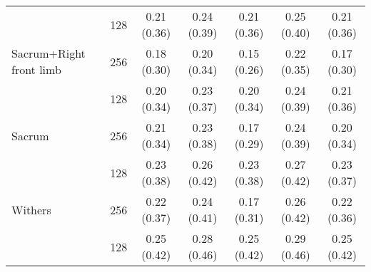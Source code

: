 \begin{table}[htbp]
{\begin{tabular}[H]{lcccccc}
    &\multicolumn{1}{c}{128}& \multicolumn{1}{c}{{\cellcolor{blue!10}0.21 (0.36)}} &  \multicolumn{1}{c}{\cellcolor{red!10}0.24 (0.39)} &  \multicolumn{1}{c}{\cellcolor{blue!10}0.21 (0.36)} &  \multicolumn{1}{c}{\cellcolor{red!15}0.25 (0.40)} &  \multicolumn{1}{c}{\cellcolor{blue!10}0.21 (0.36)} \\
    
    \multicolumn{1}{l}{Sacrum+Right front limb} &\multicolumn{1}{c}{256} & \multicolumn{1}{c}{{\cellcolor{blue!25}0.18 (0.30)}} &  \multicolumn{1}{c}{\cellcolor{blue!13}0.20 (0.34)} &  \multicolumn{1}{c}{\cellcolor{blue!45}0.15 (0.26)} &  \multicolumn{1}{c}{\cellcolor{blue!10}0.22 (0.35)} &  \multicolumn{1}{c}{\cellcolor{blue!35}0.17 (0.30)} \\

&\multicolumn{1}{c}{128}& \multicolumn{1}{c}{{\cellcolor{blue!13}0.20 (0.34)}} &  \multicolumn{1}{c}{\cellcolor{red!10}0.23 (0.37)} & \multicolumn{1}{c}{\cellcolor{blue!13}0.20 (0.34)}  & \multicolumn{1}{c}{\cellcolor{red!10}0.24 (0.39)}  & \multicolumn{1}{c}{\cellcolor{blue!10}0.21 (0.36)} \\

    \multicolumn{1}{l}{Sacrum}  &\multicolumn{1}{c}{256} & \multicolumn{1}{c}{\cellcolor{blue!10}0.21 (0.34)}  & \multicolumn{1}{c}{\cellcolor{red!10}0.23 (0.38)}  & \multicolumn{1}{c}{\cellcolor{blue!35}0.17 (0.29)}& \multicolumn{1}{c}{\cellcolor{red!10}0.24 (0.39)} & \multicolumn{1}{c}{{\cellcolor{blue!13}0.20 (0.34)}}\\
    
    &\multicolumn{1}{c}{128}& \multicolumn{1}{c}{\cellcolor{red!10}0.23 (0.38)} &  \multicolumn{1}{c}{\cellcolor{red!20}0.26 (0.42)} &  \multicolumn{1}{c}{\cellcolor{red!10}0.23 (0.38)} &  \multicolumn{1}{c}{\cellcolor{red!22}0.27 (0.42)} &  \multicolumn{1}{c}{{\cellcolor{red!10}0.23 (0.37)}} \\

    \multicolumn{1}{l}{Withers} &\multicolumn{1}{c}{256} & \multicolumn{1}{c}{\cellcolor{blue!10}0.22 (0.37)} &  \multicolumn{1}{c}{\cellcolor{red!10}0.24 (0.41)}  & \multicolumn{1}{c}{\cellcolor{blue!35}0.17 (0.31)}  & \multicolumn{1}{c}{\cellcolor{red!20}0.26 (0.42)}  & \multicolumn{1}{c}{{\cellcolor{blue!10}0.22 (0.36)}}\\
    
     &\multicolumn{1}{c}{128}& \multicolumn{1}{c}{\cellcolor{red!15}0.25 (0.42)} &  \multicolumn{1}{c}{\cellcolor{red!25}0.28 (0.46)} &  \multicolumn{1}{c}{\cellcolor{red!15}0.25 (0.42)} &  \multicolumn{1}{c}{\cellcolor{red!28}0.29 (0.46)} &  \multicolumn{1}{c}{{\cellcolor{red!15}0.25 (0.42)}}\\


\end{tabular}}
\end{table}
